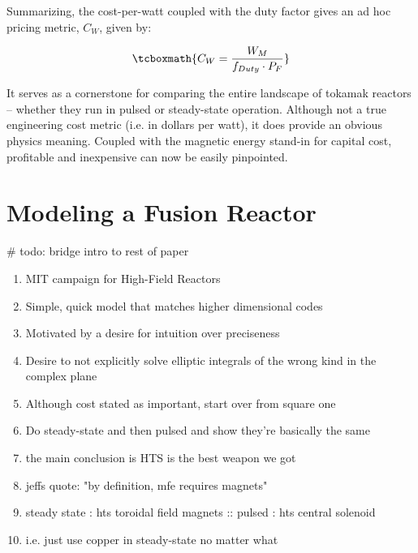 Summarizing, the cost-per-watt coupled with the duty factor gives an ad hoc pricing metric, $C_W$, given by:

\begin{equation}
	\tcboxmath{
	C_W = \frac{W_M}{f_{Duty} \cdot P_F}
	}
\end{equation}

It serves as a cornerstone for comparing the entire landscape of tokamak reactors -- whether they run in pulsed or steady-state operation. Although not a true engineering cost metric (i.e. in dollars per watt), it does provide an obvious physics meaning. Coupled with the magnetic energy stand-in for capital cost, profitable and inexpensive can now be easily pinpointed.

\section{Modeling a Fusion Reactor}

\# todo: bridge intro to rest of paper

\begin{enumerate}
	\item MIT campaign for High-Field Reactors
	\item Simple, quick model that matches higher dimensional codes
	\item Motivated by a desire for intuition over preciseness
	\item Desire to not explicitly solve elliptic integrals of the wrong kind in the complex plane
	\item Although cost stated as important, start over from square one
	\item Do steady-state and then pulsed and show they're basically the same
	\item the main conclusion is HTS is the best weapon we got
	\item jeffs quote: "by definition, mfe requires magnets"
	\item steady state : hts toroidal field magnets :: pulsed : hts central solenoid
	\item i.e. just use copper in steady-state no matter what
\end{enumerate}

%

